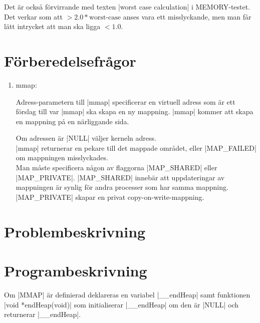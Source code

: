 \documentclass[paper=a4, fontsize=11pt]{scrartcl} %
\numberwithin{equation}{section} %
\numberwithin{figure}{section} %
\numberwithin{table}{section} %
\begin{document}
Det är också förvirrande med texten |worst case calculation| i MEMORY-testet. Det verkar som att $> 2.0*\text{worst-case}$ 
anses vara ett misslyckande, men man får lätt intrycket att man ska ligga $< 1.0$.


\section{Förberedelsefrågor}

\begin{enumerate}[1)]
\item{mmap:}

Adress-parametern till |mmap| specificerar en virtuell adress som är ett förslag till var |mmap| ska skapa en ny mappning.
|mmap| kommer att skapa en mappning på en närliggande sida.

Om adressen är |NULL| väljer kerneln adress.\\

|mmap| returnerar en pekare till det mappade området, eller |MAP_FAILED| om mappningen misslyckades.\\

Man måste specificera någon av flaggorna |MAP_SHARED| eller |MAP_PRIVATE|. |MAP_SHARED| innebär att
uppdateringar av mappningen är synlig för andra processer som har samma mappning. |MAP_PRIVATE| skapar en privat copy-on-write-mappning.
\end{enumerate}

\section{Problembeskrivning}


\section{Programbeskrivning}

%
%
Om |MMAP| är definierad deklareras en variabel |__endHeap| samt funktionen 
|void *endHeap(void)| som initialiserar |__endHeap| om den är |NULL| och returnerar |__endHeap|.\\
\end{document}
